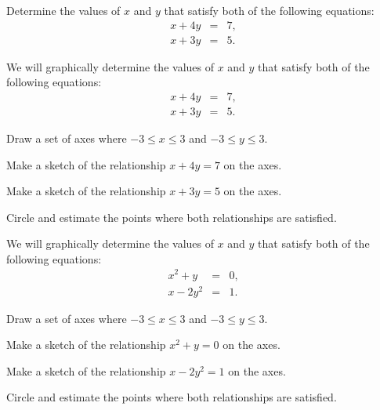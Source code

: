 \begin{problem}
\item Determine the values of $x$ and $y$ that satisfy both of the
  following equations:
  \begin{eqnarray*}
    x + 4y & = & 7, \\
    x + 3y & = & 5.
  \end{eqnarray*}
\end{problem}


\begin{problem}
\item We will graphically determine the values of $x$ and $y$ that
  satisfy both of the following equations:
  \begin{eqnarray*}
    x + 4y & = & 7, \\
    x + 3y & = & 5.
  \end{eqnarray*}
  \begin{subproblem}
  \item Draw a set of axes where $-3\leq x \leq 3$ and $-3 \leq y \leq
    3$. 


    \vfill

  \item Make a sketch of the relationship $x+4y=7$ on the axes.
  \item Make a sketch of the relationship $x+3y=5$ on the axes.
  \item Circle and estimate the points where both relationships are
    satisfied.
  \end{subproblem}

  \clearpage

\item We will graphically determine the values of $x$ and $y$ that
  satisfy both of the following equations:
  \begin{eqnarray*}
    x^2 + y  & = & 0, \\
    x - 2y^2 & = & 1.
  \end{eqnarray*}

  \begin{subproblem}
  \item Draw a set of axes where $-3\leq x \leq 3$ and $-3 \leq y \leq
    3$. 


    \vfill

  \item Make a sketch of the relationship $x^2+y=0$ on the axes.
  \item Make a sketch of the relationship $x-2y^2=1$ on the axes.
  \item Circle and estimate the points where both relationships are
    satisfied.
  \end{subproblem}


\end{problem}

